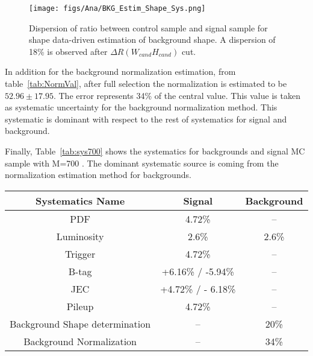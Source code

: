 \begin{figure}[!Hhtbp]
  \begin{center}
    \texttt{[image: figs/Ana/BKG\_Estim\_Shape\_Sys.png]}
    \caption{Dispersion of ratio between control sample and signal sample for shape data-driven estimation of background shape. A dispersion of 18\% is observed after $\Delta R (W_{cand} H_{cand})$ cut.}
    \label{fig:ShapeSys}
  \end{center}
\end{figure}

In addition for the background normalization estimation, from table~\ref{tab:NormVal}, after full selection the normalization is estimated to be $52.96\pm17.95$. The error represents 34\% of the central value. This value is taken as systematic uncertainty for the background normalization method. This systematic is dominant with respect to the rest of systematics for signal and background.

Finally, Table~\ref{tab:sys700} shows the systematics for backgrounds and signal MC sample with M=700 \GeVcc. The dominant systematic source is coming from the normalization estimation method for backgrounds.

\begin{table*}[htbH]
\begin{center}
\begin{tabular}{|c|c|c|}
\hline 
Systematics Name & Signal & Background \\
\hline
PDF & 4.72\% & --\\
Luminosity & 2.6\% & 2.6\%\\
Trigger & 4.72\% & --\\
B-tag & +6.16\% / -5.94\% & --\\
JEC & +4.72\% / - 6.18\% & --\\
Pileup & 4.72\% & --\\
Background Shape determination & -- & 20\%\\
Background Normalization & -- & 34\%\\
\hline
\end{tabular}
\caption{Summary of uncertainties in the case of signal mass point at 700 GeV/$c^{2}$ and for background.\label{tab:sys700}}
\end{center}
\end{table*}


